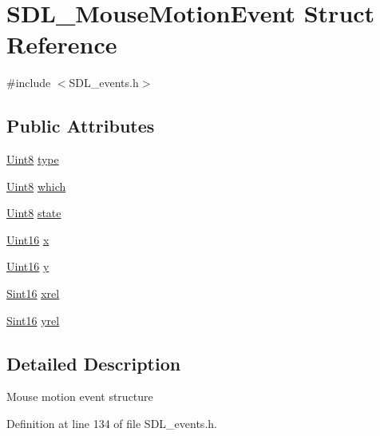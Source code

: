 \hypertarget{struct_s_d_l___mouse_motion_event}{}\section{S\+D\+L\+\_\+\+Mouse\+Motion\+Event Struct Reference}
\label{struct_s_d_l___mouse_motion_event}


{\ttfamily \#include $<$S\+D\+L\+\_\+events.\+h$>$}

\subsection*{Public Attributes}
\begin{DoxyCompactItemize}
\item 
\hyperlink{_s_d_l__stdinc_8h_a2944638813a090aa23e62f4da842c3e2}{Uint8} \hyperlink{struct_s_d_l___mouse_motion_event_ab5d4d8bef3b1a6f34429024b7aecf682}{type}
\item 
\hyperlink{_s_d_l__stdinc_8h_a2944638813a090aa23e62f4da842c3e2}{Uint8} \hyperlink{struct_s_d_l___mouse_motion_event_a7ea0004baf91d3b4572cdaadd35474c5}{which}
\item 
\hyperlink{_s_d_l__stdinc_8h_a2944638813a090aa23e62f4da842c3e2}{Uint8} \hyperlink{struct_s_d_l___mouse_motion_event_a10434904d352c7165b9de5685d10dda6}{state}
\item 
\hyperlink{_s_d_l__stdinc_8h_a31fcc0a076c9068668173ee26d33e42b}{Uint16} \hyperlink{struct_s_d_l___mouse_motion_event_abf5b246feb0afbcabcef22b924eda8c3}{x}
\item 
\hyperlink{_s_d_l__stdinc_8h_a31fcc0a076c9068668173ee26d33e42b}{Uint16} \hyperlink{struct_s_d_l___mouse_motion_event_ac7d0f0463c27e6d8e154efe5cc6c1897}{y}
\item 
\hyperlink{_s_d_l__stdinc_8h_a9d0257032c0e146ab6121bf0122712f5}{Sint16} \hyperlink{struct_s_d_l___mouse_motion_event_a84d307cc7d52073852497d8846f0a7c5}{xrel}
\item 
\hyperlink{_s_d_l__stdinc_8h_a9d0257032c0e146ab6121bf0122712f5}{Sint16} \hyperlink{struct_s_d_l___mouse_motion_event_a371e2cd4087a507663e512436fb4009b}{yrel}
\end{DoxyCompactItemize}


\subsection{Detailed Description}
Mouse motion event structure 

Definition at line 134 of file S\+D\+L\+\_\+events.\+h.



